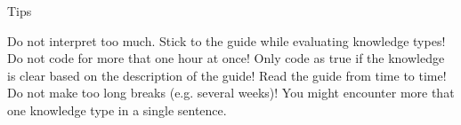 Tips

Do not interpret too much. Stick to the guide while evaluating knowledge types!
Do not code for more that one hour at once!
Only code as true if the knowledge is clear based on the description of the guide!
Read the guide from time to time!
Do not make too long breaks (e.g. several weeks)!
You might encounter more that one knowledge type in a single sentence.